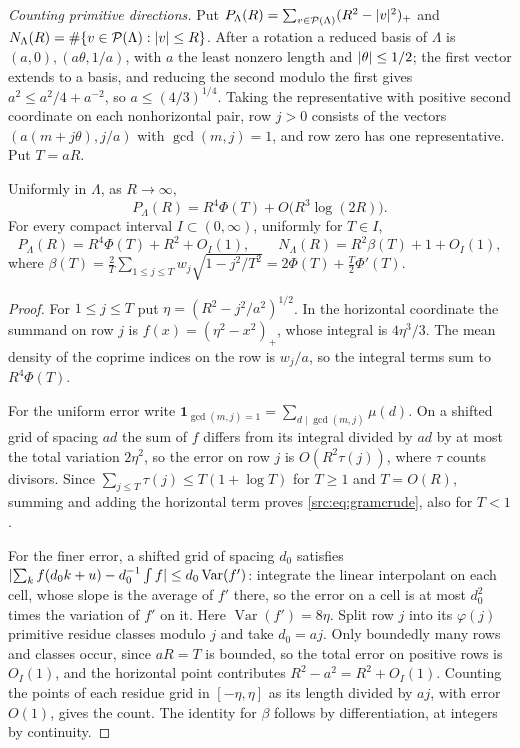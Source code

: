 \emph{Counting primitive directions.} Put
$P_\Lambda(R)=\sum_{v\in\mathcal P(\Lambda)}(R^2-\lvert v\rvert^2)_+$ and
$N_\Lambda(R)=\#\{v\in\mathcal P(\Lambda):\lvert v\rvert\le R\}$. After a rotation a reduced basis of $\Lambda$ is
$(a,0),(a\theta,1/a)$, with $a$ the least nonzero length and $\lvert\theta\rvert\le1/2$; the first vector extends to a
basis, and reducing the second modulo the first gives $a^2\le a^2/4+a^{-2}$, so $a\le(4/3)^{1/4}$. Taking
the representative with positive second coordinate on each nonhorizontal pair, row $j>0$ consists of the
vectors $(a(m+j\theta),j/a)$ with $\gcd(m,j)=1$, and row zero has one representative. Put $T=aR$.

\begin{lemma}\label{src:lem:gramcount}
Uniformly in $\Lambda$, as $R\to\infty$,
\begin{equation}\label{src:eq:gramcrude}
 P_\Lambda(R)=R^4\Phi(T)+O\bigl(R^3\log(2R)\bigr).
\end{equation}
For every compact interval $I\subset(0,\infty)$, uniformly for $T\in I$,
\begin{equation}\label{src:eq:gramsharp}
 P_\Lambda(R)=R^4\Phi(T)+R^2+O_I(1),\qquad N_\Lambda(R)=R^2\beta(T)+1+O_I(1),
\end{equation}
where $\beta(T)=\frac2T\sum_{1\le j\le T}w_j\sqrt{1-j^2/T^2}=2\Phi(T)+\frac T2\Phi'(T)$.
\end{lemma}

\begin{proof}
For $1\le j\le T$ put $\eta=(R^2-j^2/a^2)^{1/2}$. In the horizontal coordinate the summand on row $j$ is
$f(x)=(\eta^2-x^2)_+$, whose integral is $4\eta^3/3$. The mean density of the coprime indices on the row is
$w_j/a$, so the integral terms sum to $R^4\Phi(T)$.

For the uniform error write $\mathbf1_{\gcd(m,j)=1}=\sum_{d\mid\gcd(m,j)}\mu(d)$. On a shifted grid of
spacing $ad$ the sum of $f$ differs from its integral divided by $ad$ by at most the total variation
$2\eta^2$, so the error on row $j$ is $O(R^2\tau(j))$, where $\tau$ counts divisors. Since
$\sum_{j\le T}\tau(j)\le T(1+\log T)$ for $T\ge1$ and $T=O(R)$, summing and adding the horizontal term
proves \eqref{src:eq:gramcrude}, also for $T<1$.

For the finer error, a shifted grid of spacing $d_0$ satisfies
$\lvert\sum_kf(d_0k+u)-d_0^{-1}\int f\rvert\le d_0\operatorname{Var}(f')$: integrate the linear interpolant on
each cell, whose slope is the average of $f'$ there, so the error on a cell is at most $d_0^2$ times the
variation of $f'$ on it. Here $\operatorname{Var}(f')=8\eta$. Split row $j$ into its $\varphi(j)$ primitive
residue classes modulo $j$ and take $d_0=aj$. Only boundedly many rows and classes occur, since $aR=T$ is
bounded, so the total error on positive rows is $O_I(1)$, and the horizontal point contributes
$R^2-a^2=R^2+O_I(1)$. Counting the points of each residue grid in $[-\eta,\eta]$ as its length divided by
$aj$, with error $O(1)$, gives the count. The identity for $\beta$ follows by differentiation, at integers
by continuity.
\end{proof}

